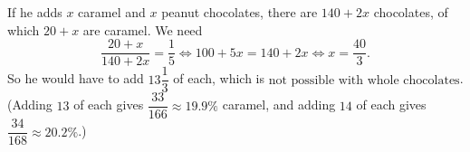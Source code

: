 If he adds $x$ caramel and $x$ peanut chocolates, there are $140+2x$ chocolates, of which $20+x$ are caramel. We need
\[\dfrac{20+x}{140+2x}=\dfrac15\iff100+5x=140+2x\iff x=\dfrac{40}{3}.\]
So he would have to add $13\dfrac13$ of each, which is $\boxed{\text{not possible with whole chocolates}}$. (Adding $13$ of each gives $\dfrac{33}{166}\approx19.9\%$ caramel, and adding $14$ of each gives $\dfrac{34}{168}\approx20.2\%$.)
